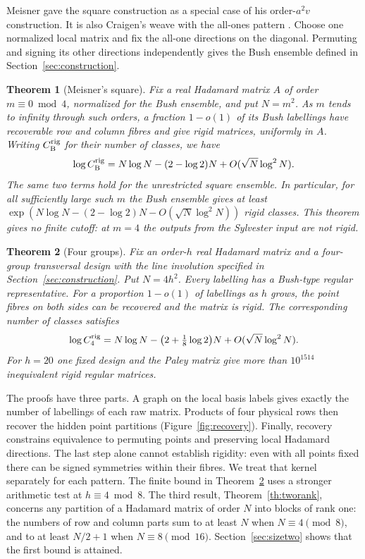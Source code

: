 \documentclass[11pt,reqno]{amsart}
\newtheorem{theorem}{Theorem}[section]
\theoremstyle{remark}\newtheorem{remark}[theorem]{Remark}
\begin{document}
Meisner \cite{meisner} gave the square construction as a special case of his order-\(a^2v\) construction. It is also Craigen's weave with the all-ones pattern \cite{craigen}. Choose one normalized local matrix and fix the all-one directions on the diagonal. Permuting and signing its other directions independently gives the Bush ensemble defined in Section~\ref{sec:construction}.

\begin{theorem}[Meisner's square]\label{th:main}
Fix a real Hadamard matrix \(A\) of order \(m\equiv0\bmod4\), normalized for the Bush ensemble, and put \(N=m^2\). As \(m\) tends to infinity through such orders, a fraction \(1-o(1)\) of its Bush labellings have recoverable row and column fibres and give rigid matrices, uniformly in \(A\). Writing \(C_{\rm B}^{\rm rig}\) for their number of classes, we have
\[
 \log C_{\rm B}^{\rm rig}=N\log N-(2-\log2)N+O(\sqrt N\log^2 N).
\]
The same two terms hold for the unrestricted square ensemble. In particular, for all sufficiently large such \(m\) the Bush ensemble gives at least \(\exp(N\log N-(2-\log2)N-O(\sqrt N\log^2N))\) rigid classes. This theorem gives no finite cutoff: at \(m=4\) the outputs from the Sylvester input are not rigid.
\end{theorem}

\begin{theorem}[Four groups]\label{th:four}
Fix an order-\(h\) real Hadamard matrix and a four-group transversal design with the line involution specified in Section~\ref{sec:construction}. Put \(N=4h^2\). Every labelling has a Bush-type regular representative. For a proportion \(1-o(1)\) of labellings as \(h\) grows, the point fibres on both sides can be recovered and the matrix is rigid. The corresponding number of classes satisfies
\[
 \log C_4^{\rm rig}=N\log N-\bigl(2+\tfrac18\log2\bigr)N
                      +O(\sqrt N\log^2 N).
\]
For \(h=20\) one fixed design and the Paley matrix give more than \(10^{1514}\) inequivalent rigid regular matrices.
\end{theorem}

The proofs have three parts. A graph on the local basis labels gives exactly the number of labellings of each raw matrix. Products of four physical rows then recover the hidden point partitions (Figure~\ref{fig:recovery}). Finally, recovery constrains equivalence to permuting points and preserving local Hadamard directions. The last step alone cannot establish rigidity: even with all points fixed there can be signed symmetries within their fibres. We treat that kernel separately for each pattern. The finite bound in Theorem~\ref{th:four} uses a stronger arithmetic test at \(h\equiv4\bmod8\). The third result, Theorem~\ref{th:tworank}, concerns any partition of a Hadamard matrix of order \(N\) into blocks of rank one: the numbers of row and column parts sum to at least \(N\) when \(N\equiv4\pmod 8\), and to at least \(N/2+1\) when \(N\equiv8\pmod{16}\). Section~\ref{sec:sizetwo} shows that the first bound is attained.
\end{document}
